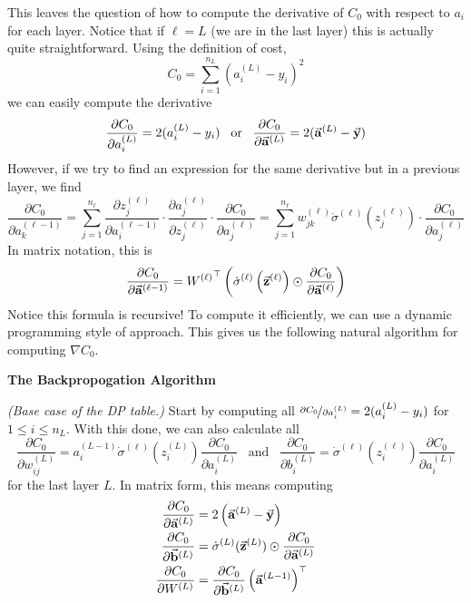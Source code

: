 This leaves the question of how to compute the derivative of $C_0$ with respect to $a_i$ for each layer. Notice that if $\ell = L$ (we 
are in the last layer) this is actually quite straightforward. Using the definition of cost,
\[
    C_0 = \sum_{i = 1}^{n_L} (a_i^{(L)} - y_i)^2
\]
we can easily compute the derivative
\[
    \frac{\partial C_0}{\partial a_i^{(L)}} = 2(a_i^{(L)} - y_i) \;\;\; \text{or} \;\;\; \frac{\partial C_0}{\partial \vec{\mathbf{a}}^{(L)}} = 2(\vec{\mathbf{a}}^{(L)} - \vec{\mathbf{y}})
\]
However, if we try to find an expression for the same derivative but in a previous layer, we find 
\[
    \frac{\partial C_0}{\partial a_k^{(\ell - 1)}} = \sum_{j = 1}^{n_\ell} \frac{\partial z_j^{(\ell)}}{\partial a_i^{(\ell - 1)}} \cdot 
                                                                             \frac{\partial a_j^{(\ell)}}{\partial z_j^{(\ell)}} \cdot 
                                                                             \frac{\partial C_0}{\partial a_j^{(\ell)}}
                                                   = \sum_{j = 1}^{n_\ell}  w_{jk}^{(\ell)} \dot\sigma^{(\ell)}(z_j^{(\ell)}) \cdot \frac{\partial C_0}{\partial a_j^{(\ell)}}
\]
In matrix notation, this is 
\[
    \frac{\partial C_0}{\partial \vec{\mathbf{a}}^{(\ell - 1)}} = {W^{(\ell)}}^\top \left(\dot\sigma^{(\ell)}\left(\vec{\mathbf{z}}^{(\ell)}\right) \odot \frac{\partial C_0}{\partial \vec{\mathbf{a}}^{(\ell)}}\right)
\]
Notice this formula is recursive! To compute it efficiently, we can use a dynamic programming style of approach. This 
gives us the following natural algorithm for computing $\nabla C_0$.

\begin{center}
    \textbf{The Backpropogation Algorithm}
\end{center}

\emph{(Base case of the DP table.)} Start by computing all $\nicefrac{\partial C_0}{\partial a_i^{(L)}} = 2(a_i^{(L)} - y_i)$ for $1 \leq i \leq n_L$.
With this done, we can also calculate all 
\[
    \frac{\partial C_0}{\partial w_{ij}^{(L)}} = a_i^{(L - 1)} \dot\sigma^{(\ell)}(z_i^{(L)}) \frac{\partial C_0}{\partial a_i^{(L)}} \;\;\; \text{and} \;\;\; \frac{\partial C_0}{\partial b_i^{(L)}} = \dot\sigma^{(\ell)}(z_i^{(\ell)}) \frac{\partial C_0}{\partial a_i^{(L)}}
\]
for the last layer $L$. In matrix form, this means computing 
\begin{align*}
    \frac{\partial C_0}{\partial \vec{\mathbf{a}}^{(L)}} &= 2\left(\vec{\mathbf{a}}^{(L)} - \vec{\mathbf{y}}\right) \\
    \frac{\partial C_0}{\partial \vec{\mathbf{b}}^{(L)}} &= \dot\sigma^{(L)}(\vec{\mathbf{z}}^{(L)}) \odot \frac{\partial C_0}{\partial \vec{\mathbf{a}}^{(L)}} \\
    \frac{\partial C_0}{\partial W^{(L)}}        &= \frac{\partial C_0}{\partial \vec{\mathbf{b}}^{(L)}} \left(\vec{\mathbf{a}}^{(L - 1)}\right)^\top
\end{align*}

